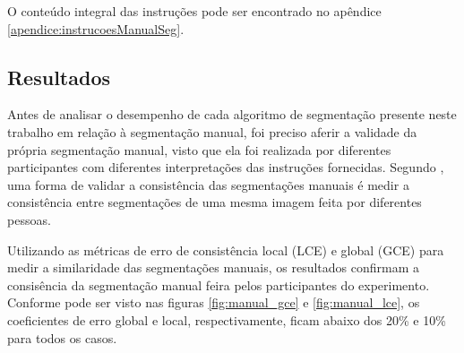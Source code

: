 O conteúdo integral das instruções pode ser encontrado no apêndice \ref{apendice:instrucoesManualSeg}.

\subsection{Resultados}

Antes de analisar o desempenho de cada algoritmo de segmentação presente neste trabalho em relação à segmentação manual, foi preciso aferir a validade da própria segmentação manual, visto que ela foi realizada por diferentes participantes com diferentes interpretações das instruções fornecidas. Segundo , uma forma de validar a consistência das segmentações manuais é medir a consistência entre segmentações de uma mesma imagem feita por diferentes pessoas.

Utilizando as métricas de erro de consistência local (LCE) e global (GCE) para medir a similaridade das segmentações manuais, os resultados confirmam a consisência da segmentação manual feira pelos participantes do experimento. Conforme pode ser visto nas figuras \ref{fig:manual_gce} e \ref{fig:manual_lce}, os coeficientes de erro global e local, respectivamente, ficam abaixo dos 20\% e 10\% para todos os casos.

